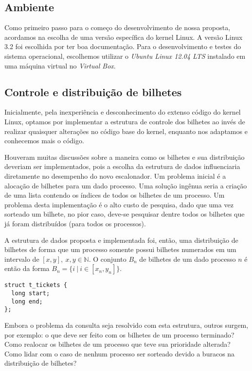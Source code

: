 \documentclass[a4paper,12pt]{article}
\begin{document}
\subsection{Ambiente}
Como primeiro passo para o começo do desenvolvimento de nossa proposta, acordamos na escolha de uma versão específica do kernel Linux. A versão Linux 3.2 \cite{Kernel2016} foi escolhida por ter boa documentação. Para o desenvolvimento e testes do sistema operacional, escolhemos utilizar o \emph{Ubuntu Linux 12.04 LTS} instalado em uma máquina virtual no \emph{Virtual Box}.

\subsection{Controle e distribuição de bilhetes}
Inicialmente, pela inexperiência e desconhecimento do extenso código do kernel Linux, optamos por implementar a estrutura de controle dos bilhetes ao invés de realizar quaisquer alterações no código base do kernel, enquanto nos adaptamos e conhecemos mais o código.

Houveram muitas discussões sobre a maneira como os bilhetes e sua distribuição deveriam ser implementados, pois a escolha da estrutura de dados influenciaria diretamente no desempenho do novo escalonador. Um problema inicial é a alocação de bilhetes para um dado processo. Uma solução ingênua seria a criação de uma lista contendo os índices de todos os bilhetes de um processo. Um problema desta implementação é o alto custo de pesquisa, dado que uma vez sorteado um bilhete, no pior caso, deve-se pesquisar dentre todos os bilhetes que já foram distribuídos (para todos os processos).

A estrutura de dados proposta e implementada foi, então, uma distribuição de bilhetes de forma que um processo somente possui bilhetes numerados em um intervalo de $[x, y],~ x, y \in \mathbb{N}$. O conjunto $B_n$ de bilhetes de um dado processo $n$ é então da forma $B_n = \{ i ~|~ i \in [x_n, y_n] \}$.

\begin{lstlisting}[caption=Estrutura de distribuição de bilhetes]
struct t_tickets {
  long start;
  long end;
};
\end{lstlisting}

Embora o problema da consulta seja resolvido com esta estrutura, outros surgem, por exemplo: o que deve ser feito com os bilhetes de um processo terminado? Como realocar os bilhetes de um processo que teve sua prioridade alterada? Como lidar com o caso de nenhum processo ser sorteado devido a buracos na distribuição de bilhetes?
\end{document}

